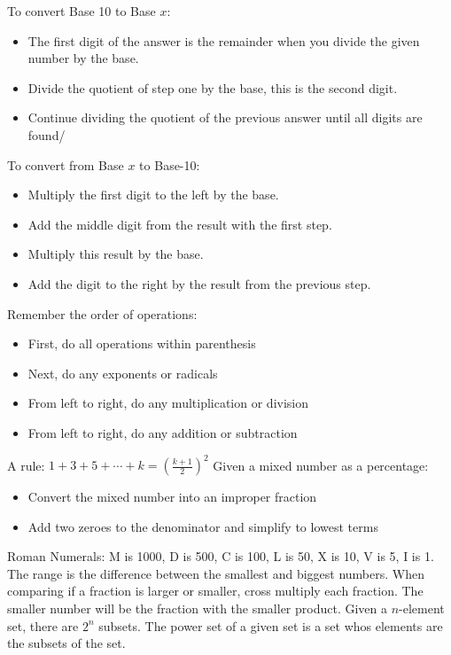 \documentclass[../uilmath.tex]{subfiles}
\begin{document}
To convert Base 10 to Base $x$:
\begin{itemize}
    \item The first digit of the answer is the remainder when you divide the given number by the base.
    \item Divide the quotient of step one by the base, this is the second digit.
    \item Continue dividing the quotient of the previous answer until all digits are found/
\end{itemize}
To convert from Base $x$ to Base-10:
\begin{itemize}
    \item Multiply the first digit to the left by the base.
    \item Add the middle digit from the result with the first step.
    \item Multiply this result by the base.
    \item Add the digit to the right by the result from the previous step.
\end{itemize}
Remember the order of operations:
\begin{itemize}
    \item First, do all operations within parenthesis
    \item Next, do any exponents or radicals
    \item From left to right, do any multiplication or division
    \item From left to right, do any addition or subtraction
\end{itemize}
A rule: $1+3+5+\cdots+k = \left(\frac{k+1}{2}\right)^2$
\smallbreak
Given a mixed number as a percentage:
\begin{itemize}
    \item Convert the mixed number into an improper fraction
    \item Add two zeroes to the denominator and simplify to lowest terms
\end{itemize}
Roman Numerals: M is 1000, D is 500, C is 100, L is 50, X is 10, V is 5, I is 1.
\smallbreak
The range is the difference between the smallest and biggest numbers.
\smallbreak
When comparing if a fraction is larger or smaller, cross multiply each fraction. The smaller number will be the fraction with the smaller product.
\smallbreak
Given a $n$-element set, there are $2^n$ subsets.
\smallbreak
The power set of a given set is a set whos elements are the subsets of the set.
\smallbreak
\end{document}
